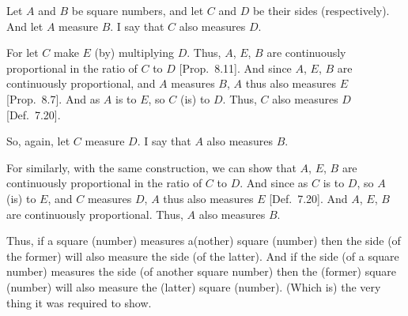 \begin{Parallel}{}{}
{Let $A$ and $B$ be square numbers, and let $C$ and $D$ be their sides (respectively). And let $A$ measure $B$. I say that $C$ also measures $D$.

\epsfysize=1in
\centerline{}

For let $C$ make $E$ (by) multiplying $D$. Thus, $A$, $E$, $B$
are continuously proportional in the ratio of $C$ to $D$
[Prop.~8.11]. And since $A$, $E$, $B$ are
continuously proportional, and $A$ measures $B$, $A$ thus also
measures $E$ [Prop.~8.7]. And as $A$ is to $E$,
so $C$ (is) to $D$. Thus, $C$ also measures $D$ [Def.~7.20].

So, again, let $C$ measure $D$. I say that $A$ also measures $B$.

For similarly, with the same construction, we can show that $A$, $E$, $B$
are continuously proportional in the ratio of $C$ to $D$. And since as $C$
is to $D$, so $A$ (is) to $E$, and $C$ measures $D$, $A$ thus
also measures $E$ [Def.~7.20]. And $A$, $E$,
$B$ are continuously proportional. Thus, $A$ also measures $B$.

Thus, if a square (number) measures a(nother) square
(number) then the side (of the former) will also measure the
side (of the latter). And if the side (of a square number) measures the side
(of another square number) then the (former) square (number) will also
measure the (latter) square (number). (Which is) the very thing it was
required to show.}
\end{Parallel}

